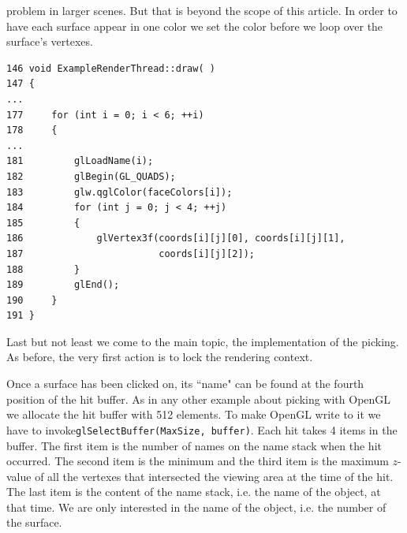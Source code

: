 \documentclass[prodmode,acmtopc]{acmsmall}
\begin{document}
problem in larger scenes.
%
But that is beyond the scope of this article.
%
In order to have each surface appear in one color we set the color before we
loop over the surface's vertexes.
\begin{lstlisting}
146 void ExampleRenderThread::draw( )
147 {
...
177     for (int i = 0; i < 6; ++i)
178     {
...
181         glLoadName(i);
182         glBegin(GL_QUADS);
183         glw.qglColor(faceColors[i]);
184         for (int j = 0; j < 4; ++j)
185         {
186             glVertex3f(coords[i][j][0], coords[i][j][1],
187                        coords[i][j][2]);
188         }
189         glEnd();
190     }
191 }
\end{lstlisting}
%
Last but not least we come to the main topic, the implementation of the picking.
%
As before, the very first action is to lock the rendering context.

Once a surface has been clicked on, its ``name" can be found at the fourth
position of the hit buffer.
%
As in any other example about picking with OpenGL we allocate the hit buffer
with 512 elements.
%
To make OpenGL write to it we have to invoke\lstinline|glSelectBuffer(MaxSize, buffer)|.
Each hit takes 4 items in the buffer.
%
The first item is the number of names on the name stack when the hit occurred.
%
The second item is the minimum and the third item is the maximum $z$-value of
all the vertexes that intersected the viewing area at the time of the hit.
%
The last item is the content of the name stack, i.e. the name of the object,
at that time.
%
We are only interested in the name of the object, i.e. the number of the
surface.
\end{document}
